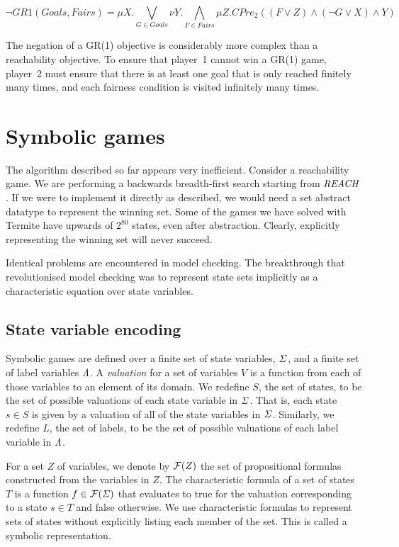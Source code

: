 \begin{equation}
    \neg GR1(Goals, Fairs) = \mu X. \bigvee_{G \in Goals} \nu Y. \bigwedge_{F \in Fairs} \mu Z. CPre_2((F \vee Z) \wedge (\neg G \vee X) \wedge Y)
\end{equation}

The negation of a GR(1) objective is considerably more complex than a reachability objective. To ensure that player~1 cannot win a GR(1) game, player~2 must ensure that there is at least one goal that is only reached finitely many times, and each fairness condition is visited infinitely many times. 

\section{Symbolic games}
\label{sec:symbolic_games}

The algorithm described so far appears very inefficient. Consider a reachability game. We are performing a backwards breadth-first search starting from $\mathit{REACH}$. If we were to implement it directly as described, we would need a set abstract datatype to represent the winning set. Some of the games we have solved with Termite have upwards of $2^{80}$ states, even after abstraction. Clearly, explicitly representing the winning set will never succeed. 

Identical problems are encountered in model checking. The breakthrough that revolutionised model checking was to represent state sets implicitly as a characteristic equation over state variables.

\subsection{State variable encoding}

Symbolic games are defined over a finite set of state variables, $\mathit{\Sigma}$, and a finite set of label variables $\mathit{\Lambda}$. A \emph{valuation} for a set of variables $V$ is a function from each of those variables to an element of its domain. We redefine $S$, the set of states, to be the set of possible valuations of each state variable in $\mathit{\Sigma}$. That is, each state $s \in S$ is given by a valuation of all of the state variables in $\mathit{\Sigma}$. Similarly, we redefine $L$, the set of labels, to be the set of possible valuations of each label variable in $\mathit{\Lambda}$.

For a set $Z$ of variables, we denote by $\mathcal{F}(Z)$ the set of propositional formulas constructed from the variables in $Z$. The characteristic formula of a set of states $T$ is a function $f \in \mathcal{F}(\mathit{\Sigma})$ that evaluates to true for the valuation corresponding to a state $s \in T$ and false otherwise. We use characteristic formulas to represent sets of states without explicitly listing each member of the set. This is called a symbolic representation. 

